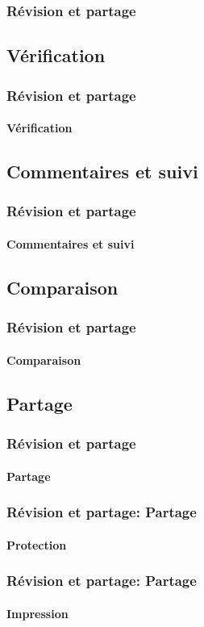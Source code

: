 \documentclass[xcolor=table]{beamer}
\begin{document}
\begin{frame}
\frametitle{Révision et partage}

\end{frame}

\subsection{Vérification}

\begin{frame}
\frametitle{Révision et partage}
\framesubtitle{Vérification}

\end{frame}

\subsection{Commentaires et suivi}

\begin{frame}
\frametitle{Révision et partage}
\framesubtitle{Commentaires et suivi}

\end{frame}

\subsection{Comparaison}

\begin{frame}
\frametitle{Révision et partage}
\framesubtitle{Comparaison}

\end{frame}

\subsection{Partage}

\begin{frame}
\frametitle{Révision et partage}
\framesubtitle{Partage}


\end{frame}

\begin{frame}
\frametitle{Révision et partage: Partage}
\framesubtitle{Protection}

\end{frame}

\begin{frame}
\frametitle{Révision et partage: Partage}
\framesubtitle{Impression}

\end{frame}
\end{document}
